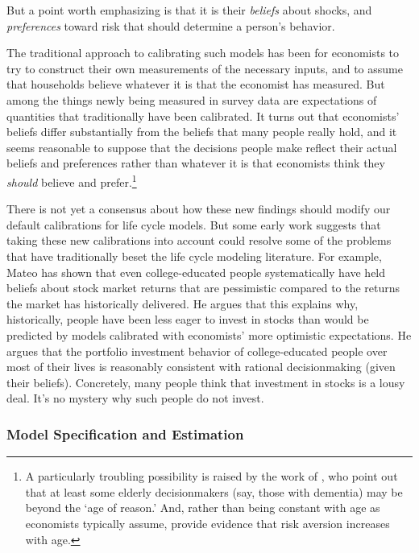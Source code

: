 \documentclass{article}
\begin{document}
But a point worth emphasizing is that it is their \textit{beliefs} about shocks, and \textit{preferences} toward risk that should determine a person's behavior.

The traditional approach to calibrating such models has been for economists to try to construct their own measurements of the necessary inputs, and to assume that households believe whatever it is that the economist has measured. But among the things newly being measured in survey data are expectations of quantities that traditionally have been calibrated. It turns out that economists' beliefs differ substantially from the beliefs that many people really hold, and it seems reasonable to suppose that the decisions people make reflect their actual beliefs and preferences rather than whatever it is that economists think they \textit{should} believe and prefer.\footnote{A particularly troubling possibility is raised by the work of \cite{gabaix2010age}, who point out that at least some elderly decisionmakers (say, those with dementia) may be beyond the `age of reason.' And, rather than being constant with age as economists typically assume, \cite{albert2012differences} provide evidence that risk aversion increases with age.}

There is not yet a consensus about how these new findings should modify our default calibrations for life cycle models. But some early work suggests that taking these new calibrations into account could resolve some of the problems that have traditionally beset the life cycle modeling literature. For example, Mateo \cite{velasquez-giraldoJMP} has shown that even college-educated people systematically have held beliefs about stock market returns that are pessimistic compared to the returns the market has historically delivered. He argues that this explains why, historically, people have been less eager to invest in stocks than would be predicted by models calibrated with economists' more optimistic expectations. He argues that the portfolio investment behavior of college-educated people over most of their lives is reasonably consistent with rational decisionmaking (given their beliefs).  Concretely, many people think that investment in stocks is a lousy deal.  It's no mystery why such people do not invest.

\subsubsection{Model Specification and Estimation}
\end{document}
